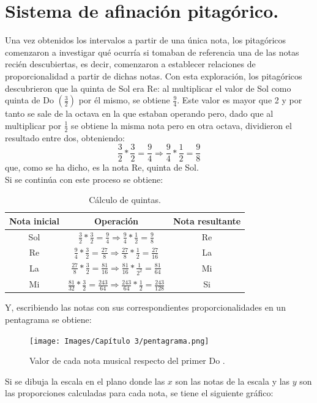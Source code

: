 \documentclass[a4paper, openright, 11pt, titlepage]{report}
\theoremstyle{definition}\newtheorem{defin}[propo]{Definition}
\theoremstyle{definition}\newtheorem{obser}[propo]{Remark}
\theoremstyle{definition}\newtheorem{ejem}[propo]{Ejemplo}
\theoremstyle{definition}\newtheorem{algoritmo}[propo]{Algoritmo}
\begin{document}
\section{Sistema de afinación pitagórico.}
Una vez obtenidos los intervalos a partir de una única nota, los pitagóricos comenzaron a investigar qué ocurría si tomaban de referencia una de las notas recién descubiertas, es decir, comenzaron a establecer relaciones de proporcionalidad a partir de dichas notas. Con esta exploración, los pitagóricos descubrieron que la quinta de Sol era Re: al multiplicar el valor de Sol como quinta de Do $(\frac{3}{2})$ por él mismo, se obtiene $\frac{9}{4}$. Este valor es mayor que 2 y por tanto se sale de la octava en la que estaban operando pero, dado que al multiplicar por $\frac{1}{2}$ se obtiene la misma nota pero en otra octava, dividieron el resultado entre dos, obteniendo: $$\frac{3}{2}*\frac{3}{2} = \frac{9}{4} \Longrightarrow \frac{9}{4}*\frac{1}{2} = \frac{9}{8}$$
que, como se ha dicho, es la nota Re, quinta de Sol. \\
Si se continúa con este proceso se obtiene:
\begin{table}[H]
\centering
\begin{tabular}{c|c|c}
\hline
     Nota inicial & Operación & Nota resultante \\
     \hline \hline
     Sol & $\frac{3}{2}*\frac{3}{2} = \frac{9}{4} \Longrightarrow \frac{9}{4}*\frac{1}{2} = \frac{9}{8}$ & Re \\
     Re & $\frac{9}{4}*\frac{3}{2} = \frac{27}{8} \Longrightarrow \frac{27}{8}*\frac{1}{2} = \frac{27}{16}$ & La \\
     La & $\frac{27}{8}*\frac{3}{2} = \frac{81}{16} \Longrightarrow \frac{81}{16}*\frac{1}{2^{2}} = \frac{81}{64}$ & Mi\\
     Mi & $\frac{81}{32}*\frac{3}{2} = \frac{243}{64} \Longrightarrow \frac{243}{64}*\frac{1}{2} = \frac{243}{128}$ & Si \\
     \hline
\end{tabular}
\caption{Cálculo de quintas.}
\label{tablaquintas}
\end{table}
Y, escribiendo las notas con sus correspondientes proporcionalidades en un pentagrama se obtiene:
\begin{figure}[H]
    \centering
    \texttt{[image: Images/Capítulo 3/pentagrama.png]}
    \caption{Valor de cada nota musical respecto del primer Do .}
\end{figure}
Si se dibuja la escala en el plano donde las $x$ son las notas de la escala y las $y$ son las proporciones calculadas para cada nota, se tiene el siguiente gráfico:
\end{document}

